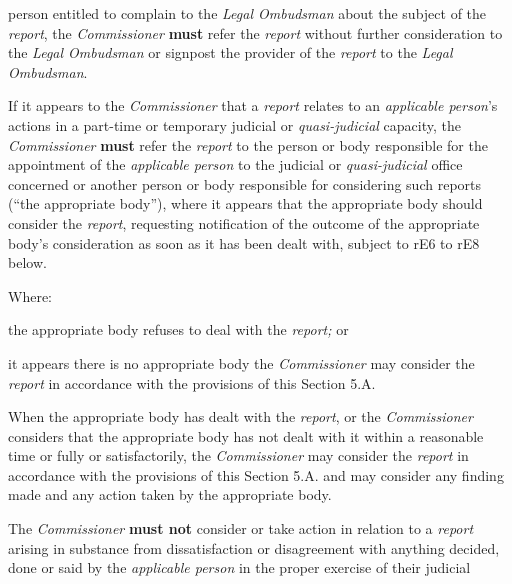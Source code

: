 person entitled to complain to the \emph{Legal Ombudsman} about the
subject of the \emph{report}, the \emph{Commissioner}  \textcolor{myred}{\textbf{must}} refer
the \emph{report} without further consideration to the \emph{Legal
Ombudsman} or signpost the provider of the \emph{report} to
the \emph{Legal Ombudsman}.\\
\par
{}\par
If it appears to the \emph{Commissioner} that a \emph{report} relates to
an \emph{applicable person}'s actions in a part-time or temporary
judicial or \emph{quasi-judicial} capacity, the \emph{Commissioner}  \textcolor{myred}{\textbf{must}}
refer the \emph{report} to the person or body responsible for the
appointment of the \emph{applicable person} to the judicial
or \emph{quasi-judicial} office concerned or another  person or body
responsible for considering such reports (``the appropriate body''),
where it appears that the appropriate body should consider
the \emph{report}, requesting notification of the outcome of the
appropriate body's consideration as soon as it has been dealt with,
subject to rE6 to rE8 below.\\
\par
Where:\\\nl \item the appropriate body refuses to deal with the \emph{report; }or\item it appears there is no appropriate body\ln
the \emph{Commissioner} may consider the \emph{report} in accordance
with the provisions of this Section 5.A.\\
\par
When the appropriate body has dealt with the \emph{report}, or
the \emph{Commissioner} considers that the appropriate body has not
dealt with it within a reasonable time or fully or satisfactorily,
the \emph{Commissioner} may consider the \emph{report} in accordance
with the provisions of this Section 5.A. and may consider any finding
made and any action taken by the appropriate body.
\par
The \emph{Commissioner}  \textcolor{myred}{\textbf{must not}} consider or take action in relation to
a \emph{report} arising in substance from dissatisfaction or
disagreement with anything decided, done or said by the \emph{applicable
person} in the proper exercise of their judicial
